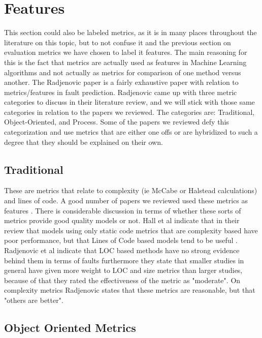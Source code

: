 \documentclass{sig-alternate-05-2015}
\begin{document}
\section{Features}

This section could also be labeled metrics, as it is in many places throughout the literature on this topic, but to not confuse it and the previous section on evaluation metrics we have chosen to label it features.  The main reasoning for this is the fact that metrics are actually used as features in Machine Learning algorithms and not actually as metrics for comparison of one method versus another.  The Radjenovic paper \cite{Radjenovic} is a fairly exhaustive paper with relation to metrics/features in fault prediction.  Radjenovic came up with three metric categories to discuss in their literature review, and we will stick with those same categories in relation to the papers we reviewed.  The categories are: Traditional, Object-Oriented, and Process.  Some of the papers we reviewed defy this categorization and use metrics that are either one offs or are hybridized to such a degree that they should be explained on their own.

\subsection{Traditional}

These are metrics that relate to complexity (ie McCabe or Halstead calculations) and lines of code.  A good number of papers we reviewed used these metrics as features \cite{Posnett} \cite{Vandecruys} \cite{Bird}.  There is considerable discussion in terms of whether these sorts of metrics provide good quality models or not.  Hall et al indicate that in their review that models using only static code metrics that are complexity based have poor performance, but that Lines of Code based models tend to be useful \cite{Hall}.  Radjenovic et al indicate that LOC based methods have no strong evidence behind them in terms of faults furthermore they state that smaller studies in general have given more weight to LOC and size metrics than larger studies, because of that they rated the effectiveness of the metric as "moderate"\cite{Radjenovic}.  On complexity metrics Radjenovic states that these metrics are reasonable, but that "others are better"\cite{Radjenovic}.  

\subsection{Object Oriented Metrics}
\end{document}
